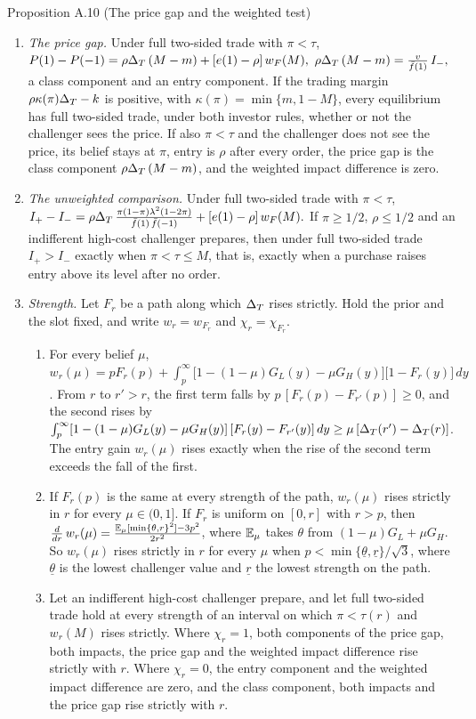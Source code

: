 {\begin{paperresult}{Proposition A.10 (The price gap and the weighted test)}
\begin{enumerate}[label=(\roman*),leftmargin=2em,nosep]
\item \emph{The price gap.} Under full two-sided trade with \(\pi<\tau\),
\(
P(1)-P(-1)=\rho\DT\,(M-m)+[e(1)-\rho]\,w_F(M),\ \rho\DT\,(M-m)=\frac{v}{\bar f(1)}\,I_-,
\)
a class component and an entry component. If the trading margin \(\rho\kappa(\pi)\Delta_T-k\) is positive, with \(\kappa(\pi)=\min\{m,1-M\}\), every equilibrium has full two-sided trade, under both investor rules, whether or not the challenger sees the price. If also \(\pi<\tau\) and the challenger does not see the price, its belief stays at \(\pi\), entry is \(\rho\) after every order, the price gap is the class component \(\rho\Delta_T\,(M-m)\), and the weighted impact difference is zero.
\item \emph{The unweighted comparison.} Under full two-sided trade with \(\pi<\tau\),
\(
I_+-I_-=\rho\Delta_T\,\frac{\pi(1-\pi)\lambda^2(1-2\pi)}{\bar f(1)\,\bar f(-1)}+[e(1)-\rho]\,w_F(M).
\)
If \(\pi\ge1/2\), \(\rho\le1/2\) and an indifferent high-cost challenger prepares, then under full two-sided trade \(I_+>I_-\) exactly when \(\pi<\tau\le M\), that is, exactly when a purchase raises entry above its level after no order.
\item \emph{Strength.} Let \(F_r\) be a path along which \(\Delta_T\) rises strictly. Hold the prior and the slot fixed, and write \(w_r=w_{F_r}\) and \(\chi_r=\chi_{F_r}\).
\begin{enumerate}[label=(\alph*),leftmargin=2em,nosep]
\item For every belief \(\mu\), \(w_r(\mu)=pF_r(p)+\int_p^\infty\bigl[1-(1-\mu)G_L(y)-\mu G_H(y)\bigr]\bigl[1-F_r(y)\bigr]\,dy\). From \(r\) to \(r'>r\), the first term falls by \(p\,[F_r(p)-F_{r'}(p)]\ge0\), and the second rises by \(\int_p^\infty[1-(1-\mu)G_L(y)-\mu G_H(y)]\,[F_r(y)-F_{r'}(y)]\,dy\ge\mu\,[\Delta_T(r')-\Delta_T(r)]\). The entry gain \(w_r(\mu)\) rises exactly when the rise of the second term exceeds the fall of the first.
\item If \(F_r(p)\) is the same at every strength of the path, \(w_r(\mu)\) rises strictly in \(r\) for every \(\mu\in(0,1]\). If \(F_r\) is uniform on \([0,r]\) with \(r>p\), then \(\frac{d}{dr}\,w_r(\mu)=\frac{\mathbb{E}_\mu[\min\{\theta,r\}^2]-3p^2}{2r^2}\), where \(\mathbb{E}_\mu\) takes \(\theta\) from \((1-\mu)G_L+\mu G_H\). So \(w_r(\mu)\) rises strictly in \(r\) for every \(\mu\) when \(p<\min\{\underline\theta,\underline r\}/\sqrt3\), where \(\underline\theta\) is the lowest challenger value and \(\underline r\) the lowest strength on the path.
\item Let an indifferent high-cost challenger prepare, and let full two-sided trade hold at every strength of an interval on which \(\pi<\tau(r)\) and \(w_r(M)\) rises strictly. Where \(\chi_r=1\), both components of the price gap, both impacts, the price gap and the weighted impact difference rise strictly with \(r\). Where \(\chi_r=0\), the entry component and the weighted impact difference are zero, and the class component, both impacts and the price gap rise strictly with \(r\).

\end{enumerate}
\end{enumerate}
\end{paperresult}}
